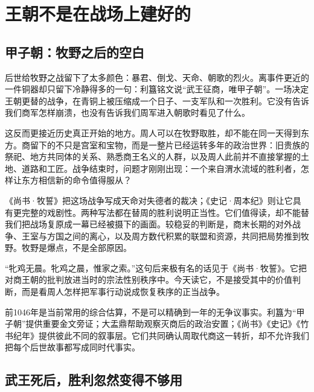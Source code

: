 \section{王朝不是在战场上建好的}

\subsection{甲子朝：牧野之后的空白}


后世给牧野之战留下了太多颜色：暴君、倒戈、天命、朝歌的烈火。离事件更近的一件铜器却只留下冷静得多的一句：利簋铭文说“武王征商，唯甲子朝”。一场决定王朝更替的战争，在青铜上被压缩成一个日子、一支军队和一次胜利。它没有告诉我们商军怎样崩溃，也没有告诉我们周军进入朝歌时看见了什么。

这反而更接近历史真正开始的地方。周人可以在牧野取胜，却不能在同一天得到东方。商留下的不只是宫室和宝物，而是一整片已经运转多年的政治世界：旧贵族的祭祀、地方共同体的关系、熟悉商王名义的人群，以及周人此前并不直接掌握的土地、道路和工匠。战争结束时，问题才刚刚出现：一个来自渭水流域的胜利者，怎样让东方相信新的命令值得服从？

《尚书·牧誓》把这场战争写成天命对失德者的裁决；《史记·周本纪》则让它具有更完整的戏剧性。两种写法都在替周的胜利说明正当性。它们值得读，却不能替我们把战场复原成一幕已经被摄下的画面。较稳妥的判断是，商末长期的对外战争、王室与方国之间的离心，以及周方数代积累的联盟和资源，共同把局势推到牧野。牧野是爆点，不是全部原因。

\begin{textwindow}[《尚书·牧誓》不是战地录音]
“牝鸡无晨。牝鸡之晨，惟家之索。”这句后来极有名的话见于《尚书·牧誓》。它把对商王朝的批判放进当时的宗法性别秩序中。今天读它，不是接受其中的价值判断，而是看周人怎样把军事行动说成恢复秩序的正当战争。
\end{textwindow}

\begin{sourcenote}[牧野能证实到哪里]
前1046年是当前常用的综合估算，不是可以精确到一年的无争议事实。利簋为“甲子朝”提供重要金文旁证；大盂鼎帮助观察灭商后的政治安置；《尚书》《史记》《竹书纪年》提供彼此不同的叙事层。它们共同确认周取代商这一转折，却不允许我们把每个后世故事都写成同时代事实。
\end{sourcenote}

\subsection{武王死后，胜利忽然变得不够用}

